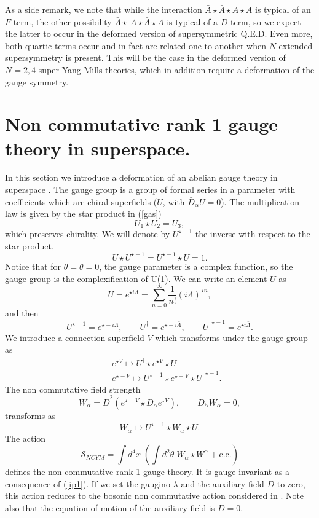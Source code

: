\documentclass[a4paper,12pt]{article}
\begin{document}
As a side remark, we note that while the interaction $\bar A\star\bar
A\star A\star A$ is
typical of an $F$-term, the other possibility $\bar A\star\ A\star\bar
A\star A$ is typical
 of a $D$-term, so we expect the latter to occur in the deformed version
of supersymmetric Q.E.D.
Even more, both quartic terms occur and in fact are related one to another
when $N$-extended
supersymmetry is present. This will be the case in the deformed version of
$N=2,4$ super
 Yang-Mills theories, which in addition require a deformation of the gauge
symmetry.



\section{Non commutative rank 1 gauge theory in superspace.}


In this section we introduce a deformation of an abelian gauge theory in
superspace
\cite{wz2, fz}.
The gauge group is a group of formal series in a parameter with
coefficients which are 
 chiral superfields ($U$, with $\bar D_{\dot\alpha}U=0$).
The multiplication law is given by the star product in  (\ref{gas})
$$
U_1\star U_2=U_3,
$$
 which preserves chirality.
We will denote by $U^{\star -1}$ the inverse with respect to the star
product,
$$
U\star U^{\star -1}=U^{\star -1}\star U=1.
$$
Notice that for $\theta=\bar\theta=0$, the gauge parameter is a complex
function, so 
the gauge group is  the complexification of U(1).  We can write an element
$U$ as
$$ 
U=e^{\star i\Lambda}=\sum_{n=0}^\infty \frac{1}{n!}(i\Lambda)^{\star n},
$$
and then
$$
U^{\star -1}=e^{\star - i\Lambda},\qquad U^\dagger=e^{\star - i\bar
\Lambda},\qquad 
{U^\dagger}^{\star -1}=e^{\star  i\bar \Lambda}.
$$
We introduce a connection superfield $V$ \cite{fz}  which  transforms
under the gauge group as
\begin{eqnarray*}
&&e^{\star V}\mapsto U^\dagger\star e^{\star V}\star U\\
&&e^{\star -V}\mapsto U^{\star -1}\star e^{\star - V}\star
{U^\dagger}^{\star -1}.
\end{eqnarray*}
The non commutative field strength
$$
W_\alpha={\bar D}^2(e^{\star -V}\star D_\alpha e^{\star V}),\qquad \bar
D_{\dot \alpha}W_\alpha=0,
$$
transforms as
$$
W_\alpha\mapsto U^{\star -1}\star W_\alpha \star U.
$$
The action
\begin{equation}
\mathcal{S}_{NCYM}=\int d^4x\;(\int d^2\theta\; W_\alpha\star W^\alpha +
\mbox{c.c.})
\label{ncym}
\end{equation}
defines the non commutative rank 1 gauge theory. It is gauge invariant as
a consequence of (\ref{ip1}).
 If we set the gaugino $\lambda$ and the auxiliary field $D$ to zero,
this action reduces to the bosonic non commutative action considered in
\cite{sw}. Note also
that the equation of motion of the auxiliary field is $D=0$.
\end{document}
